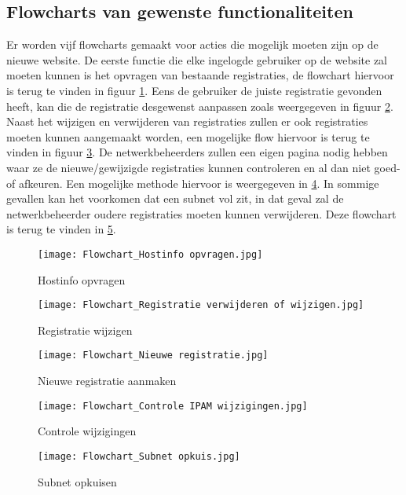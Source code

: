 \subsection{Flowcharts van gewenste functionaliteiten}
Er worden vijf flowcharts gemaakt voor acties die mogelijk moeten zijn op de nieuwe website.
De eerste functie die elke ingelogde gebruiker op de website zal moeten kunnen is het opvragen van bestaande registraties, de flowchart hiervoor is terug te vinden in figuur  \ref{fig:flowchart_hostinfo_opvragen}. Eens de gebruiker de juiste registratie gevonden heeft, kan die de registratie desgewenst aanpassen zoals weergegeven in figuur \ref{fig:flowchart_registratie_wijzigen}. Naast het wijzigen en verwijderen van registraties zullen er ook registraties moeten kunnen aangemaakt worden, een mogelijke flow hiervoor is terug te vinden in figuur \ref{fig:flowchart_nieuwe_registratie}.
De netwerkbeheerders zullen een eigen pagina nodig hebben waar ze de nieuwe/gewijzigde registraties kunnen controleren en al dan niet goed- of afkeuren. Een mogelijke methode hiervoor is weergegeven in \ref{fig:flowchart_controle_Wijzigingen}. In sommige gevallen kan het voorkomen dat een subnet vol zit, in dat geval zal de netwerkbeheerder oudere registraties moeten kunnen verwijderen. Deze flowchart is terug te vinden in \ref{fig:flowchart_subnet_opkuisen}.

\begin{figure}[H]
	\texttt{[image: Flowchart\_Hostinfo opvragen.jpg]}
	\caption{Hostinfo opvragen}
	\label{fig:flowchart_hostinfo_opvragen}
\end{figure}
\begin{figure}[H]
    \texttt{[image: Flowchart\_Registratie verwijderen of wijzigen.jpg]}
    \caption{Registratie wijzigen}
    \label{fig:flowchart_registratie_wijzigen}
\end{figure}
\begin{figure}[H]
    \texttt{[image: Flowchart\_Nieuwe registratie.jpg]}
    \caption{Nieuwe registratie aanmaken}
    \label{fig:flowchart_nieuwe_registratie}
\end{figure}
\begin{figure}[H]
    \texttt{[image: Flowchart\_Controle IPAM wijzigingen.jpg]}
    \caption{Controle wijzigingen}
    \label{fig:flowchart_controle_Wijzigingen}
\end{figure}
\begin{figure}[H]
    \texttt{[image: Flowchart\_Subnet opkuis.jpg]}
    \caption{Subnet opkuisen}
    \label{fig:flowchart_subnet_opkuisen}
\end{figure}

